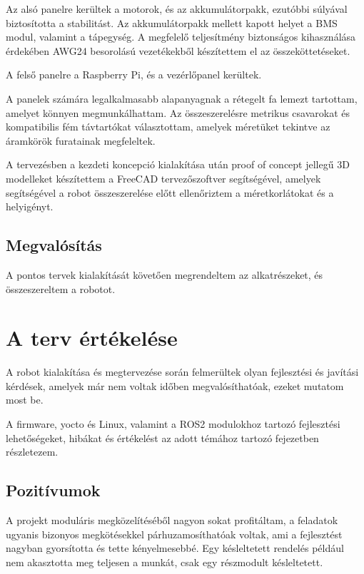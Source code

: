 Az alsó panelre kerültek a motorok, és az akkumulátorpakk, ezutóbbi súlyával
biztosította a stabilitást. Az akkumulátorpakk mellett kapott helyet a BMS modul,
valamint a tápegység. A megfelelő teljesítmény biztonságos kihasználása érdekében
AWG24 besorolású vezetékekből készítettem el az összeköttetéseket.

A felső panelre a Raspberry Pi, és a vezérlőpanel kerültek.

A panelek számára legalkalmasabb alapanyagnak a rétegelt fa lemezt tartottam,
amelyet könnyen megmunkálhattam. Az összeszerelésre metrikus csavarokat és
kompatibilis fém távtartókat választottam, amelyek méretüket tekintve az
áramkörök furatainak megfeleltek.

A tervezésben a kezdeti koncepció kialakítása után proof of concept jellegű 
3D modelleket készítettem a FreeCAD tervezőszoftver segítségével, amelyek
segítségével a robot összeszerelése előtt ellenőriztem a méretkorlátokat és a
helyigényt.

\subsection{Megvalósítás}

A pontos tervek kialakítását követően megrendeltem az alkatrészeket, és
összeszereltem a robotot.

\section{A terv értékelése}

A robot kialakítása és megtervezése során felmerültek olyan fejlesztési és
javítási kérdések, amelyek már nem voltak időben megvalósíthatóak, ezeket mutatom
most be.

A firmware, yocto és Linux, valamint a ROS2 modulokhoz tartozó fejlesztési
lehetőségeket, hibákat és értékelést az adott témához tartozó fejezetben
részletezem.

\subsection{Pozitívumok}

A projekt moduláris megközelítéséből nagyon sokat profitáltam, a feladatok
ugyanis bizonyos megkötésekkel párhuzamosíthatóak voltak, ami a fejlesztést
nagyban gyorsította és tette kényelmesebbé. Egy késleltetett rendelés például nem
akasztotta meg teljesen a munkát, csak egy részmodult késleltetett.

